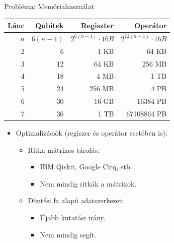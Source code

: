 \documentclass[aspectratio=169]{beamer}
\begin{document}
\begin{frame}[t]{Probléma: Memóriahasználat}
\vspace{2mm}
\begin{tabular}{r|r|r|r}
Lánc & Qubitek & Regiszter & Operátor \\
\hline
\rule{0pt}{1.05\normalbaselineskip} $n$ & $6(n-1)$ & $2^{6(n-1)} \cdot{} 16 B$ & ${2^{12(n-1)}} \cdot{} 16 B$  \pause{} \\
\hline
2 & 6 &  1 KB &  64 KB \\
3 & 12 &  64 KB &  256 MB \\
4 & 18 &  4 MB & \color{red} 1 TB \\
5 & 24 &  256 MB & \color{red} 4 PB \\
6 & 30 &  16 GB & \color{red} 16384 PB \\
7 & 36 & \color{red} 1 TB & \color{red} 67108864 PB
\end{tabular}
\pause
\vspace{2mm}
\begin{itemize}
    \item Optimalizációk (regiszer és operátor esetében is):
    \begin{itemize}
        \item Ritka mátrixos tárolás:
        \begin{itemize}
          \item IBM Qiskit, Google Cirq, stb.
          \item Nem mindig ritkák a mátrixok.
        \end{itemize}
        \item Döntési fa alapú adatszerkezet:
        \begin{itemize}
            \item Újabb kutatási irány.
            \item Nem mindig segít.
        \end{itemize}
    \end{itemize}
\end{itemize}

\end{frame}

\end{document}
